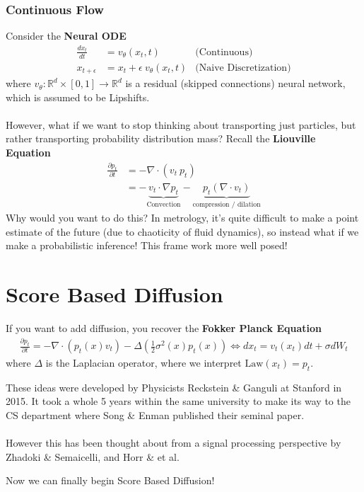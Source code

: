 \subsubsection{Continuous Flow}
Consider the \textbf{Neural ODE}
\begin{align}
	\frac{dx_t}{dt} & = v_\theta(x_t,t) & \text{(Continuous)}\\
	x_{t+\epsilon} & = x_t + \epsilon~ v_\theta(x_t, t) & \text{(Naive Discretization)}
\end{align}
where $v_\theta : \mathbb R^d \times [0,1] \to \mathbb R^d$ is a residual (skipped connections) neural network, which is assumed to be Lipshifts.\\
\\
However, what if we want to stop thinking about transporting just particles, but rather transporting probability distribution mass? Recall the \textbf{Liouville Equation}
\begin{align}
	\frac{\partial p_t}{\partial t} & = - \nabla \cdot (v_t ~p_t)\\
	& = - \underbrace{v_t \cdot \nabla p_t}_{\text{Convection}} - \underbrace{p_t (\nabla \cdot  v_t )}_{\text{compression / dilation}}
\end{align}
Why would you want to do this? In metrology, it's quite difficult to make a point estimate of the future (due to chaoticity of fluid dynamics), so instead what if we make a probabilistic inference! This frame work more well posed! 

\section{Score Based Diffusion}
If you want to add diffusion, you recover the \textbf{Fokker Planck Equation}
\begin{align}
	\frac{\partial p_t}{\partial t} = - \nabla \cdot (p_t(x) v_t) - \Delta \left(\frac{1}{2} \sigma^2(x) p_t(x) \right)\iff dx_t = v_t(x_t) dt + \sigma dW_t \label{eqn:FokkerPlanck}
\end{align}
where $\Delta$ is the Laplacian operator, where we interpret $\text{Law}(x_t) = p_t$. 

\begin{sidework}
	These ideas were developed by Physicists Reckstein \& Ganguli at Stanford in 2015. It took a whole 5 years within the same university to make its way to the CS department where Song \& Enman published their seminal paper. 
	\\
	\\
	However this has been thought about from a signal processing perspective by Zhadoki \& Semaicelli, and Horr \& et al.
\end{sidework}
Now we can finally begin Score Based Diffusion!
